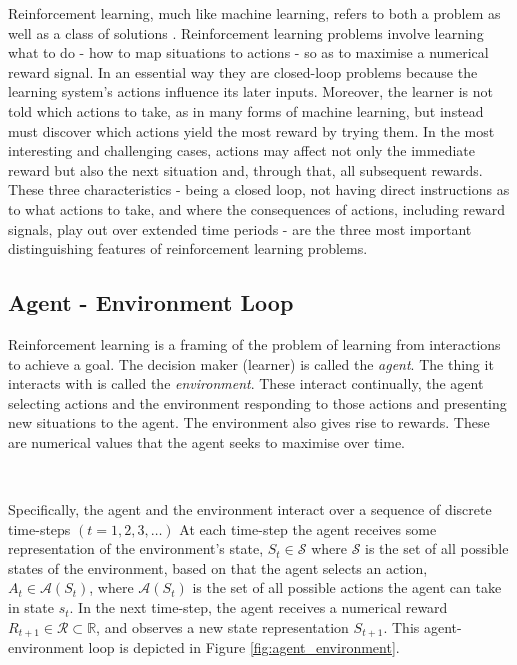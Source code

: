 \documentclass{article}
\begin{document}
Reinforcement learning, much like machine learning, refers to both a problem as well as a class of solutions \citep{sutton2018reinforcement}. Reinforcement learning problems involve learning what to do - how to map situations to actions - so as to maximise a numerical reward signal. In an essential way they are closed-loop problems because the learning system’s actions influence its later inputs. Moreover, the learner is not told which actions to take, as in many forms of machine learning, but instead must discover which actions yield the most reward by trying them. In the most interesting and challenging cases, actions may affect not only the immediate reward but also the next situation and, through that, all subsequent rewards. These three characteristics - being a closed loop, not having direct instructions as to what actions to take, and where the consequences of actions, including reward signals, play out over extended time periods - are the three most important distinguishing features of reinforcement learning problems.


\subsection{Agent - Environment Loop}

Reinforcement learning is a framing of the problem of learning from interactions to achieve a goal. The decision maker (learner) is called the \textit{agent}. The thing it interacts with is called the \textit{environment}. These interact continually, the agent selecting actions and the environment responding to those actions and presenting new situations to the agent. The environment also gives rise to rewards. These are numerical values that the agent seeks to maximise over time.

\

Specifically, the agent and the environment interact over a sequence of discrete time-steps $(t = 1, 2, 3, \hdots)$ At each time-step the agent receives some representation of the environment's state, $S_t \in \mathcal{S}$ where $\mathcal{S}$ is the set of all possible states of the environment, based on that the agent selects an action, $A_t \in \mathcal{A}(S_t)$, where $\mathcal{A}(S_t)$ is the set of all possible actions the agent can take in state $s_t$. In the next time-step, the agent receives a numerical reward $R_{t+1} \in \mathcal{R} \subset \mathbb{R}$, and observes a new state representation $S_{t+1}$. This agent-environment loop is depicted in Figure \ref{fig:agent_environment}.
\end{document}

